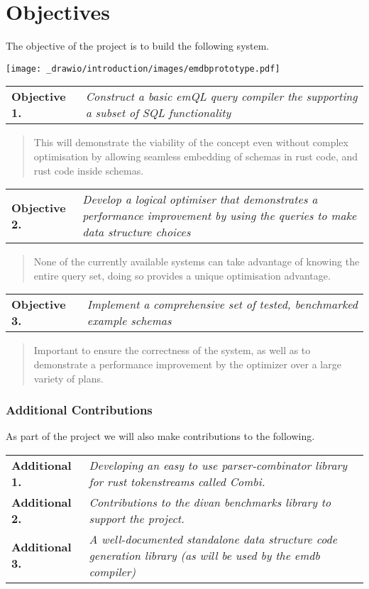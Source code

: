 \section{Objectives}
The objective of the project is to build the following system.
\begin{center}
    \texttt{[image: \_drawio/introduction/images/emdbprototype.pdf]}
\end{center}
\begin{tabular}{l p{}}
    \textbf{Objective 1.} & \textit{Construct a basic emQL query compiler the supporting a subset of SQL functionality}
\end{tabular}
\begin{quote}
    This will demonstrate the viability of the concept even without complex
    optimisation by allowing seamless embedding of schemas in rust code, and rust code inside schemas.
\end{quote}
\begin{tabular}{l p{}}
    \textbf{Objective 2.} & \textit{Develop a logical optimiser that demonstrates a performance improvement by using the queries to make data structure choices}
\end{tabular}
\begin{quote}
    None of the currently available systems can take advantage of knowing the entire
    query set, doing so provides a unique optimisation advantage.
\end{quote}
\begin{tabular}{l p{}}
    \textbf{Objective 3.} & \textit{Implement a comprehensive set of tested, benchmarked example schemas}
\end{tabular}
\begin{quote}
    Important to ensure the correctness of the system, as well as to demonstrate a performance
    improvement by the optimizer over a large variety of plans.
\end{quote}

\subsubsection{Additional Contributions}
As part of the project we will also make contributions to the following.
\begin{center}
    \begin{tabular}{l p{}}
        \textbf{Additional 1.} & \textit{Developing an easy to use parser-combinator library for rust tokenstreams called Combi.}
        \\ \textbf{Additional 2.} & \textit{Contributions to the divan benchmarks library to support the project.}
        \\ \textbf{Additional 3.} & \textit{A well-documented standalone data structure code generation library (as will be used by the emdb compiler)}
    \end{tabular}
\end{center}